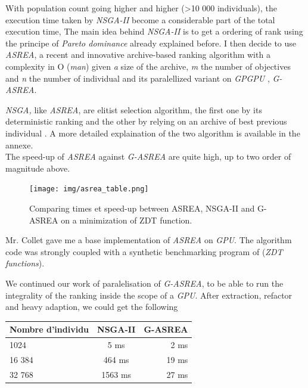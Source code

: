 \documentclass[12pt]{memoir}
\begin{document}
With population count going higher and higher  (\textgreater{}10 000
individuals), the execution time taken by \textit{NSGA-II} become a considerable part of the total execution time,
The main idea behind \textit{NSGA-II} is to get a ordering of rank using the principe of \textit{Pareto dominance} already explained before. I then decide to use \textit{ASREA}, a recent and innovative archive-based ranking algorithm with a complexity in O (\emph{man}) given \emph{a} size of the archive, \emph{m} the number of objectives and \emph{n} the number of individual and its paralellized variant on \emph{GPGPU} , \emph{G-ASREA\cite{sharma2010gpgpu}}.

\bigskip
\emph{NSGA,} like \emph{ASREA}, are elitist selection algorithm, the first one by its deterministic ranking and the other by relying on an archive of best previous individual . A more detailed explaination of the two algorithm is available in the annexe. \\ 
The speed-up of \emph{ASREA} against \emph{G-ASREA} are quite high, up to two order of magnitude above. 
\begin{figure}[htbp]
	\begin{center}
		\texttt{[image: img/asrea\_table.png]}
		\caption{Comparing times et speed-up between ASREA, NSGA-II and G-ASREA on a minimization of ZDT function\cite{zitzler2000comparison}.}
	\end{center}
\end{figure}

Mr. Collet gave me a base implementation of \emph{ASREA} on \textit{GPU}. The algorithm code was strongly coupled with a synthetic benchmarking program of (\emph{ZDT functions\cite{zitzler2000comparison}}).

We continued our work of paralelisation of \textit{G-ASREA}, to be able to run the integrality of the ranking inside the scope of a \textit{GPU}. After extraction, refactor and heavy adaption, we could get the following 

\begin{center}
	\begin{tabular}{ |l| c| r| }
		\hline
		Nombre d'individu & NSGA-II & G-ASREA \\
		\hline
		1024 & 5 ms & 2 ms \\
		16 384 & 464 ms & 19 ms\\
		32 768  & 1563 ms& 27 ms\\
		\hline
	\end{tabular}
\end{center}
\end{document}
